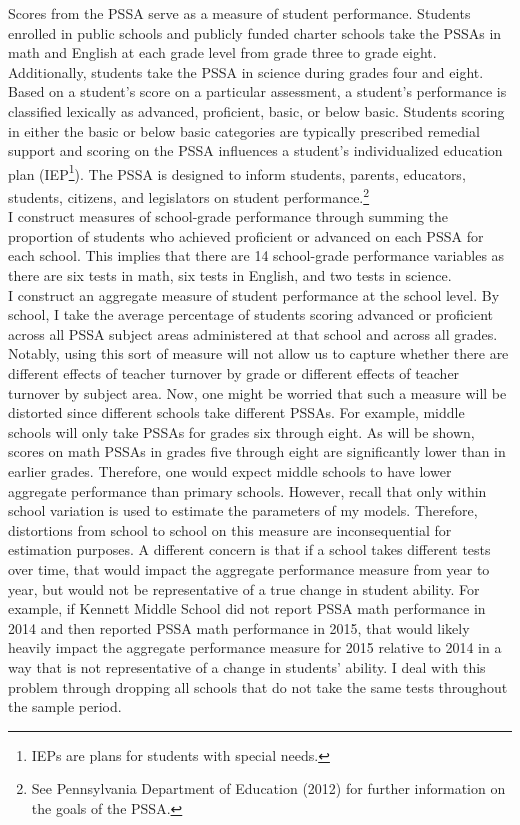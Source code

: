 \documentclass[12pt]{report}
\begin{document}
\indent Scores from the PSSA serve as a measure of student performance. Students enrolled in public schools and publicly funded charter schools take the PSSAs in math and English at each grade level from grade three to grade eight. Additionally, students take the PSSA in science during grades four and eight. Based on a student's score on a particular assessment, a student's performance is classified lexically as advanced, proficient, basic, or below basic. Students scoring in either the basic or below basic categories are typically prescribed remedial support and scoring on the PSSA influences a student's individualized education plan (IEP\footnote{IEPs are plans for students with special needs.})\nocite{pssa}. The PSSA is designed to inform students, parents, educators, students, citizens, and legislators on student performance.\footnote{See Pennsylvania Department of Education (2012) \nocite{pssa} for further information on the goals of the PSSA.} 
\\
\indent I construct measures of school-grade performance through summing the proportion of students who achieved proficient or advanced on each PSSA for each school. This implies that there are 14 school-grade performance variables as there are six tests in math, six tests in English, and two tests in science. 
\\
\indent I construct an aggregate measure of student performance at the school level. By school, I take the average percentage of students scoring advanced or proficient across all PSSA subject areas administered at that school and across all grades. Notably, using this sort of measure will not allow us to capture whether there are different effects of teacher turnover by grade or different effects of teacher turnover by subject area. Now, one might be worried that such a measure will be distorted since different schools take different PSSAs. For example, middle schools will only take PSSAs for grades six through eight. As will be shown, scores on math PSSAs in grades five through eight are significantly lower than in earlier grades. Therefore, one would expect middle schools to have lower aggregate performance than primary schools. However, recall that only within school variation is used to estimate the parameters of my models. Therefore, distortions from school to school on this measure are inconsequential for estimation purposes. A different concern is that if a school takes different tests over time, that would impact the aggregate performance measure from year to year, but would not be representative of a true change in student ability. For example, if Kennett Middle School did not report PSSA math performance in 2014 and then reported PSSA math performance in 2015, that would likely heavily impact the aggregate performance measure for 2015 relative to 2014 in a way that is not representative of a change in students' ability. I deal with this problem through dropping all schools that do not take the same tests throughout the sample period. \\
\end{document}
